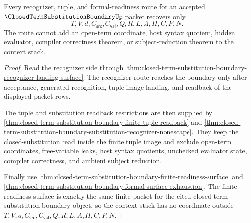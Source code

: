 \begin{theorem}
\label{thm:closed-term-substitution-boundary-context-stack-nonescape}
Every recognizer, tuple, and formal-readiness route for an accepted $\ClosedTermSubstitutionBoundaryUp$ packet recovers only
$$
T,V,d,C_{\mathsf{src}},C_{\mathsf{val}},Q,R,L,A,H,C,P,N.
$$
The route cannot add an open-term coordinate, host syntax quotient, hidden evaluator, compiler correctness theorem, or subject-reduction theorem to the context stack.
\end{theorem}
\begin{proof}
Read the recognizer side through \autoref{thm:closed-term-substitution-boundary-recognizer-landing-surface}. The recognizer route reaches the boundary only after acceptance, generated recognition, tuple-image landing, and readback of the displayed packet rows.

The tuple and substitution readback restrictions are then supplied by \autoref{thm:closed-term-substitution-boundary-finite-tuple-readback} and \autoref{thm:closed-term-substitution-boundary-substitution-recognizer-nonescape}. They keep the closed-substitution read inside the finite tuple image and exclude open-term coordinates, free-variable leaks, host syntax quotients, unchecked evaluator state, compiler correctness, and ambient subject reduction.

Finally use \autoref{thm:closed-term-substitution-boundary-finite-readiness-surface} and \autoref{thm:closed-term-substitution-boundary-formal-surface-exhaustion}. The finite readiness surface is exactly the same finite packet for the cited closed-term substitution boundary object, so the context stack has no coordinate outside $T,V,d,C_{\mathsf{src}},C_{\mathsf{val}},Q,R,L,A,H,C,P,N$.
\end{proof}

